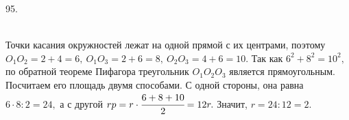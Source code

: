 95. \begin{figure}[ht!]
\end{figure}\\
Точки касания окружностей лежат на одной прямой с их центрами, поэтому $O_1O_2=2+4=6,\ O_1O_3=2+6=8,\ O_2O_3=4+6=10.$ Так как $6^2+8^2=10^2,$ по обратной теореме Пифагора треугольник $O_1O_2O_3$ является прямоугольным. Посчитаем его площадь двумя способами. С одной стороны, она равна $6\cdot8:2=24,$ а с другой $rp=r\cdot\cfrac{6+8+10}{2}=12r.$ Значит, $r=24:12=2.$\newpage\noindent
